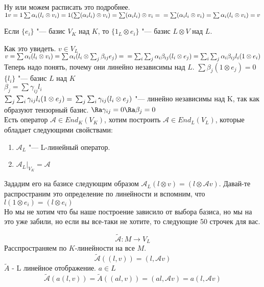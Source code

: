 \begin{enumerate}
Ну или можем расписать это подробнее.
$1v = 1\sum \alpha_i(l_i \otimes v_i) = \\
1(\sum (\alpha_i l_i) \otimes v_i) = \sum(\alpha_i l_i)\otimes v_i  =\\
= \sum(\alpha_i l_i \otimes v_i) = \sum \alpha_i(l_i \otimes v_i) = v$


Если $\{e_i\}$ "--- базис $V_K$ над $K$, то
$\{1_L \otimes e_i\}$ "--- базис $L \otimes V$ над $L$.

Как это увидеть. 
$v \in V_L$\\
$v = \sum \alpha_i(l_i \otimes v_i) = \sum \alpha_i(l_i \otimes \sum_{j}\beta_{ij}e_j) = \\
 = \sum_{i}\sum_{j}\alpha_i \beta_{ij} (l_i \otimes e_j) = \sum_{i}\sum_{j}\alpha_i \beta_{ij}l_i(1 \otimes e_i)$\\

Теперь надо понять, почему они линейно независимы над $L$.
$\sum \beta_{j}(1 \otimes e_j) = 0$\\
$\{l_i\}$ "--- базис $L$ над $K$\\
$\beta_j = \sum \gamma_{ij}l_i$\\
$\sum_j \sum_i \gamma_{ij}l_i(1 \otimes e_j) =\\ 
\sum_j \sum_i \gamma_{ij}(l_i \otimes e_j)$  "--- линейно независимы над K, так как образуют тензорный базис.
$\Ra \gamma_{ij} = 0 \Ra \beta_j = 0$\\
 

Есть оператор $\mathcal{A} \in End_K(V_K)$, хотим построить $\mathcal{A} \in End_L(V_L)$, 
которые обладает следующими свойствами:
\begin{enumerate}
\item
$\mathcal{A}_L$ "--- L-линейный оператор.
\item 
$\mathcal{A}_L|_{V_K} = \mathcal{A}$
\end{enumerate}

Зададим его на базисе следующим образом $\mathcal{A}_L(l \otimes v) = (l \otimes \mathcal{A}v)$.
Давай-те распространим это определение по линейности и вспомним, что $l(1 \otimes e_i) = (l \otimes e_i)$\\ 

Но мы не хотим что бы наше построение зависило от выбора базиса, но мы на это уже забили, но если вы все-таки
не хотите, то следующие 50 строчек для вас.

$$\tilde{\mathcal{A}} \colon M \to V_L$$
Расспространяем по $K$-линейности на все $M$.
$$\tilde{\mathcal{A}}((l, v)) = (l, \mathcal{A}v)$$ 
$\tilde A$ - L линейное отображение. 
$a \in L$
$$\tilde{\mathcal{A}}(a(l, v)) = \tilde{A}((al, v)) = (al,  \mathcal{A}v) = a(l,  \mathcal A v)$$


\end{enumerate}
